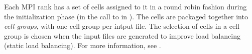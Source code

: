 Each MPI rank has a set of cells assigned to it in a round robin fashion during the initialization phase (in the call to  in ).
The cells are packaged together into \emph{cell groups}, with one cell group per intput file. The selection of cells in a cell group is chosen when the input files are generated to improve load balancing (static load balancing).
For more information, see .


%
%


